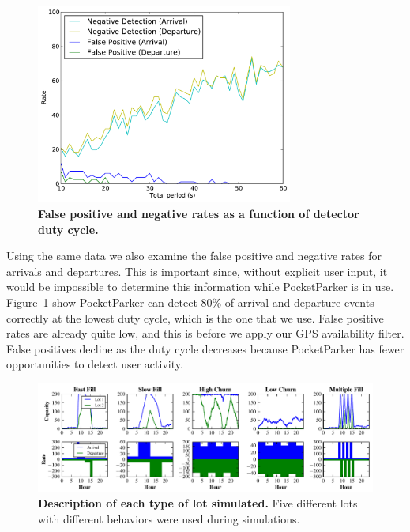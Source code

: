 \begin{figure}
\centering
\includegraphics[width=3.325in]{./figures/Rate_FP_and_ND.pdf}

\caption{\textbf{False positive and negative rates as a function of detector
duty cycle.}} 

\label{fig-falsepositives}
\end{figure}

Using the same data we also examine the false positive and negative rates for
arrivals and departures. This is important since, without explicit user
input, it would be impossible to determine this information while
PocketParker is in use. Figure~\ref{fig-falsepositives} show PocketParker can
detect 80\% of arrival and departure events correctly at the lowest duty
cycle, which is the one that we use. False positive rates are already quite
low, and this is before we apply our GPS availability filter. False positives
decline as the duty cycle decreases because PocketParker has fewer
opportunities to detect user activity.

\begin{figure}
\centering
\includegraphics[width=\textwidth]{./simulator/figures/lots.pdf}

\caption{\textbf{Description of each type of lot simulated.} Five different
lots with different behaviors were used during simulations.}

\label{fig-lotsdescription}
\end{figure}


